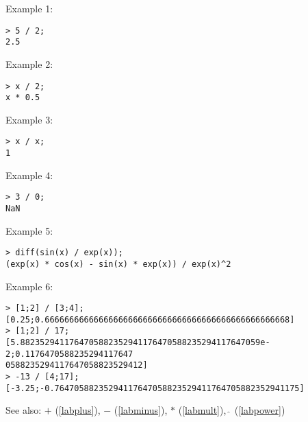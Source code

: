 \noindent Example 1: 
\begin{center}\begin{minipage}{15cm}\begin{Verbatim}[frame=single,commandchars=\\\|\~]
> 5 / 2;
2.5
\end{Verbatim}
\end{minipage}\end{center}
\noindent Example 2: 
\begin{center}\begin{minipage}{15cm}\begin{Verbatim}[frame=single,commandchars=\\\|\~]
> x / 2;
x * 0.5
\end{Verbatim}
\end{minipage}\end{center}
\noindent Example 3: 
\begin{center}\begin{minipage}{15cm}\begin{Verbatim}[frame=single,commandchars=\\\|\~]
> x / x;
1
\end{Verbatim}
\end{minipage}\end{center}
\noindent Example 4: 
\begin{center}\begin{minipage}{15cm}\begin{Verbatim}[frame=single,commandchars=\\\|\~]
> 3 / 0;
NaN
\end{Verbatim}
\end{minipage}\end{center}
\noindent Example 5: 
\begin{center}\begin{minipage}{15cm}\begin{Verbatim}[frame=single,commandchars=\\\|\~]
> diff(sin(x) / exp(x));
(exp(x) * cos(x) - sin(x) * exp(x)) / exp(x)^2
\end{Verbatim}
\end{minipage}\end{center}
\noindent Example 6: 
\begin{center}\begin{minipage}{15cm}\begin{Verbatim}[frame=single,commandchars=\\\|\~]
> [1;2] / [3;4];
[0.25;0.66666666666666666666666666666666666666666666666668]
> [1;2] / 17;
[5.8823529411764705882352941176470588235294117647059e-2;0.1176470588235294117647
0588235294117647058823529412]
> -13 / [4;17];
[-3.25;-0.76470588235294117647058823529411764705882352941175]
\end{Verbatim}
\end{minipage}\end{center}
See also: \textbf{$+$} (\ref{labplus}), \textbf{$-$} (\ref{labminus}), \textbf{$*$} (\ref{labmult}), \textbf{$\mathbf{\hat{~}}$} (\ref{labpower})
